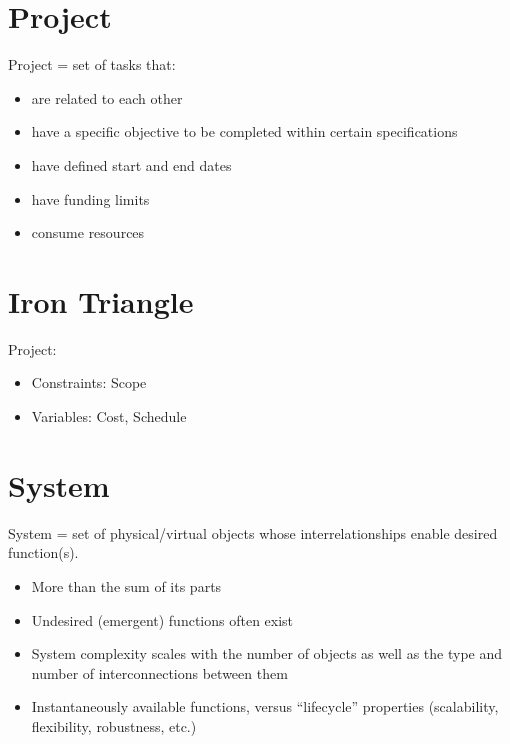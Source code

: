 \documentclass[letterpaper,10pt,english]{jupyterBook}
\begin{document}
\section{Project}
\label{\detokenize{SPM/spm-concepts:project}}
\sphinxAtStartPar
Project = set of tasks that:
\begin{itemize}
\item {} 
\sphinxAtStartPar
are related to each other

\item {} 
\sphinxAtStartPar
have a specific objective to be completed within certain specifications

\item {} 
\sphinxAtStartPar
have defined start and end dates

\item {} 
\sphinxAtStartPar
have funding limits

\item {} 
\sphinxAtStartPar
consume resources

\end{itemize}


\section{Iron Triangle}
\label{\detokenize{SPM/spm-concepts:iron-triangle}}
\sphinxAtStartPar
Project:
\begin{itemize}
\item {} 
\sphinxAtStartPar
Constraints: Scope

\item {} 
\sphinxAtStartPar
Variables: Cost, Schedule

\end{itemize}


\section{System}
\label{\detokenize{SPM/spm-concepts:system}}
\sphinxAtStartPar
System = set of physical/virtual objects whose interrelationships enable desired function(s).
\begin{itemize}
\item {} 
\sphinxAtStartPar
More than the sum of its parts

\item {} 
\sphinxAtStartPar
Undesired (emergent) functions often exist

\item {} 
\sphinxAtStartPar
System complexity scales with the number of objects as well as the type and number of interconnections between them

\item {} 
\sphinxAtStartPar
Instantaneously available functions, versus “lifecycle” properties (scalability, flexibility, robustness, etc.)

\end{itemize}
\end{document}
